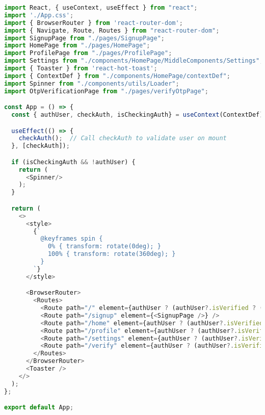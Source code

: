 \documentclass[12pt,a4paper]{report}
\begin{document}
\begin{lstlisting}[language=JavaScript, caption=React App Component, label={lst:appjs}, breaklines=true, breakatwhitespace=true, basicstyle=\ttfamily\footnotesize, frame=single]
import React, { useContext, useEffect } from "react";
import './App.css';
import { BrowserRouter } from 'react-router-dom';
import { Navigate, Route, Routes } from "react-router-dom";
import SignupPage from "./pages/SignupPage";
import HomePage from "./pages/HomePage";
import ProfilePage from "./pages/ProfilePage";
import Settings from "./components/HomePage/MiddleComponents/Settings";
import { Toaster } from 'react-hot-toast';
import { ContextDef } from "./components/HomePage/contextDef";
import Spinner from "./components/utils/Loader";
import OtpVerificationPage from "./pages/verifyOtpPage";

const App = () => {
  const { authUser, checkAuth, isCheckingAuth} = useContext(ContextDef);

  useEffect(() => {
    checkAuth();  // Call checkAuth to validate user on mount
  }, [checkAuth]);

  if (isCheckingAuth && !authUser) {
    return (
      <Spinner/>
    );
  }

  return (
    <>
      <style>
        {`
          @keyframes spin {
            0% { transform: rotate(0deg); }
            100% { transform: rotate(360deg); }
          }
        `}
      </style>

      <BrowserRouter>
        <Routes>
          <Route path="/" element={authUser ? (authUser?.isVerified ? (<Navigate to="/home" />) : <Navigate to="/verify" />) : <Navigate to="/signup" />} />
          <Route path="/signup" element={<SignupPage />} />
          <Route path="/home" element={authUser ? (authUser?.isVerified ? (<HomePage />) : <Navigate to="/verify" />) : <Navigate to="/signup" />} />
          <Route path="/profile" element={authUser ? (authUser?.isVerified ? (<ProfilePage />) : <Navigate to="/verify" />) : <Navigate to="/signup" />} />
          <Route path="/settings" element={authUser ? (authUser?.isVerified ? (<Settings />) : <Navigate to="/verify" />) : <Navigate to="/signup" />} />
          <Route path="/verify" element={authUser ? (authUser?.isVerified ? (<Navigate to="/home" />) : <OtpVerificationPage />) : <Navigate to="/signup" />} />
        </Routes>
      </BrowserRouter>
      <Toaster />
    </>
  );
};

export default App;
\end{lstlisting}
\end{document}
